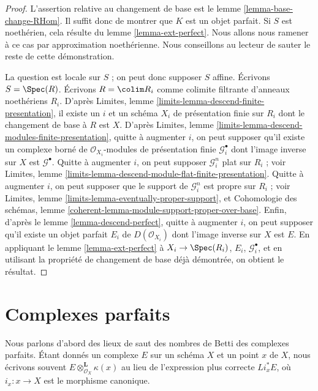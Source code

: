\begin{proof}
L'assertion relative au changement de base est le lemme \ref{lemma-base-change-RHom}.
Il suffit donc de montrer que $K$ est un objet parfait. Si $S$ est
noethérien, cela résulte du
lemme \ref{lemma-ext-perfect}.
Nous allons nous ramener à ce cas par approximation noethérienne.
Nous conseillons au lecteur de sauter le reste de cette démonstration.

\medskip\noindent
La question est locale sur $S$ ; on peut donc supposer $S$ affine.
Écrivons $S = \Spec(R)$. Écrivons $R = \colim R_i$ comme colimite filtrante
d'anneaux noethériens $R_i$. D'après Limites, lemme
\ref{limits-lemma-descend-finite-presentation},
il existe un $i$ et un schéma $X_i$ de présentation finie sur $R_i$
dont le changement de base à $R$ est $X$. D'après
Limites, lemme \ref{limits-lemma-descend-modules-finite-presentation},
quitte à augmenter $i$, on peut supposer qu'il existe un complexe borné
de $\mathcal{O}_{X_i}$-modules de présentation finie $\mathcal{G}_i^\bullet$
dont l'image inverse sur $X$ est $\mathcal{G}^\bullet$. Quitte à augmenter $i$,
on peut supposer $\mathcal{G}_i^n$ plat sur $R_i$ ; voir
Limites, lemme \ref{limits-lemma-descend-module-flat-finite-presentation}.
Quitte à augmenter $i$, on peut supposer que le support de $\mathcal{G}_i^n$
est propre sur $R_i$ ; voir
Limites, lemme \ref{limits-lemma-eventually-proper-support}, et
Cohomologie des schémas, lemme
\ref{coherent-lemma-module-support-proper-over-base}.
Enfin, d'après le lemme \ref{lemma-descend-perfect},
quitte à augmenter $i$, on peut supposer qu'il existe un objet parfait
$E_i$ de $D(\mathcal{O}_{X_i})$ dont l'image inverse sur
$X$ est $E$. En appliquant le lemme \ref{lemma-ext-perfect}
à $X_i \to \Spec(R_i)$, $E_i$, $\mathcal{G}_i^\bullet$, et en utilisant la
propriété de changement de base déjà démontrée, on obtient le résultat.
\end{proof}









\section{Complexes parfaits}
\label{section-perfect-complexes}

\noindent
Nous parlons d'abord des lieux de saut des nombres de Betti des complexes parfaits.
Étant donnés un complexe $E$ sur un schéma $X$ et un point $x$ de $X$, nous écrivons souvent
$E \otimes_{\mathcal{O}_X}^\mathbf{L} \kappa(x)$ au lieu de l'expression plus correcte
$Li_x^*E$, où $i_x : x \to X$ est le morphisme canonique.

